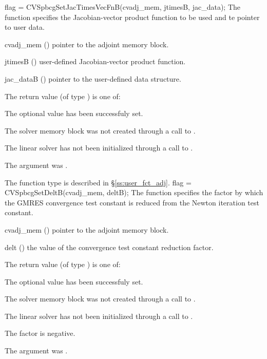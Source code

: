 {
  flag = CVSpbcgSetJacTimesVecFnB(cvadj\_mem, jtimesB, jac\_data);
}
{
  The function  specifies the Jacobian-vector 
  product function to be used and te pointer to user data.
}
{
  \begin{args}
  \item[cvadj\_mem] ()
    pointer to the adjoint memory block.
  \item[jtimesB] ()
    user-defined Jacobian-vector product function.
  \item[jac\_dataB] ()
    pointer to the user-defined data structure.
  \end{args}
}
{
  The return value  (of type ) is one of:
  \begin{args}
  \item[\Id{CVSPGMR\_SUCCESS}] 
    The optional value has been successfuly set.
  \item[\Id{CVSPGMR\_MEM\_NULL}]
    The {\cvodes} solver memory block was not created through a call to .
  \item[\Id{CVSPGMR\_LMEM\_NULL}]
    The {\cvspbcg} linear solver has not been initialized through a call to .
  \item[\Id{CVSPGMR\_ADJMEM\_NULL}]
    The  argument was .
  \end{args}
}
{
  The function type  is described in \S\ref{ss:user_fct_adj}.
}
{
  flag = CVSpbcgSetDeltB(cvadj\_mem, deltB);
}
{
  The function  specifies the factor by
  which the GMRES convergence test constant is reduced
  from the Newton iteration test constant.
}
{
  \begin{args}
  \item[cvadj\_mem] ()
    pointer to the adjoint memory block.
  \item[delt] ()
    the value of the convergence test constant reduction factor.
  \end{args}
}
{
  The return value  (of type ) is one of:
  \begin{args}
  \item[\Id{CVSPGMR\_SUCCESS}] 
    The optional value has been successfuly set.
  \item[\Id{CVSPGMR\_MEM\_NULL}]
    The {\cvodes} solver memory block was not created through a call to .
  \item[\Id{CVSPGMR\_LMEM\_NULL}]
    The {\cvspbcg} linear solver has not been initialized through a call to .
  \item[\Id{CVSPGMR\_ILL\_INPUT}]
    The factor  is negative.  
  \item[\Id{CVSPGMR\_ADJMEM\_NULL}]
    The  argument was .
  \end{args}
}
